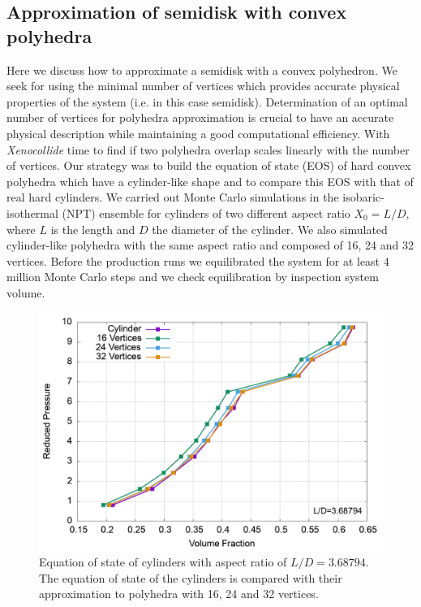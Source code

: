 \documentclass[aip,jcp, amsmath, amssymb, reprint]{revtex4-1}
\begin{document}
\subsection{Approximation of semidisk with convex polyhedra}
Here we discuss how to approximate a semidisk with a convex polyhedron. We seek for using the minimal number of vertices
which provides accurate physical properties of the system (i.e. in this case semidisk).
Determination of an optimal number of vertices for polyhedra approximation is crucial to have an accurate physical
description while maintaining a good computational efficiency.
With \textit{Xenocollide} time to find if two polyhedra overlap scales linearly with the number of vertices.
Our strategy was to build the equation of state (EOS) of hard convex polyhedra which have a cylinder-like shape and to 
compare this EOS with that of real hard cylinders.
We carried out Monte Carlo simulations in the isobaric-isothermal (NPT) ensemble for
cylinders of two different aspect ratio $X_0=L/D$, where $L$ is the length and $D$ the diameter of the cylinder. 
We also simulated cylinder-like polyhedra with the same aspect ratio and composed of 16, 24 and 32 vertices.
Before the production runs we equilibrated the system for at least $4$ million Monte Carlo steps and we check 
equilibration by inspection system volume.
\begin{figure}[h!] \includegraphics[width=0.9\linewidth]{cylapprox.png}
  \caption{\label{fig:cylapprox} Equation of state of cylinders with aspect ratio of $L/D=3.68794$. The equation of
  state of the cylinders is compared with their approximation to polyhedra with 16, 24 and 32 vertices.}
\end{figure}
\end{document}

